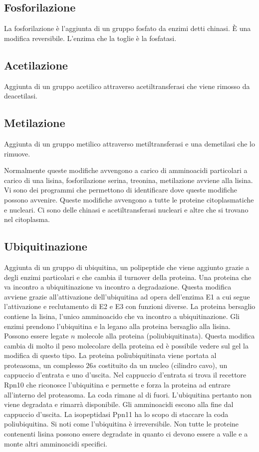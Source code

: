 \subsection{Fosforilazione}
La fosforilazione \`e l'aggiunta di un gruppo fosfato da enzimi detti chinasi. \`E una modifica reversibile. L'enzima che la toglie \`e la fosfatasi.
\subsection{Acetilazione}
Aggiunta di un gruppo acetilico attraverso acetiltransferasi che viene rimosso da deacetilasi. 
\subsection{Metilazione}
Aggiunta di un gruppo metilico attraverso metiltransferasi e una demetilasi che lo rimuove. 

Normalmente queste modifiche avvengono a carico di amminoacidi particolari a carico di una lisina, fosforilazione serina, treonina, metilazione avviene alla lisina. Vi sono dei programmi
che permettono di identificare dove queste modifiche possono avvenire. Queste modifiche avvengono a tutte le proteine citoplasmatiche e nucleari. Ci sono delle chinasi e acetiltransferasi
nucleari e altre che si trovano nel citoplasma. 
\subsection{Ubiquitinazione}
Aggiunta di un gruppo di ubiquitina, un polipeptide che viene aggiunto grazie a degli enzimi particolari e che cambia il turnover della proteina. Una proteina che va incontro a 
ubiquitinazione va incontro a degradazione. Questa modifica avviene grazie all'attivazione dell'ubiquitina ad opera dell'enzima E1 a cui segue l'attivazione e reclutamento di E2 e E3 con
funzioni diverse. La proteina bersaglio contiene la lisina, l'unico amminoacido che va incontro a ubiquitinazione. Gli enzimi prendono l'ubiquitina e la legano alla proteina bersaglio
alla lisina. Possono essere legate $n$ molecole alla proteina (poliubiquitinata). Questa modifica cambia di molto il peso molecolare della proteina ed \`e possibile vedere sul gel la
modifica di questo tipo. La proteina poliubiquitinata viene portata al proteasoma, un complesso $26s$ costituito da un nucleo (cilindro cavo), un cappuccio d'entrata e uno d'uscita. Nel
cappuccio d'entrata si trova il recettore Rpn10 che riconosce l'ubiquitina e permette e forza la proteina ad entrare all'interno del proteasoma. La coda rimane al di fuori. L'ubiquitina 
pertanto non viene degradata e rimarr\`a disponibile. Gli amminoacidi escono alla fine dal cappuccio d'uscita. La isopeptidasi Ppn11 ha lo scopo di staccare la coda poliubiquitina. 
Si noti come l'ubiquitina \`e irreversibile. Non tutte le proteine contenenti lisina possono essere degradate in quanto ci devono essere a valle e a monte altri amminoacidi specifici. 

